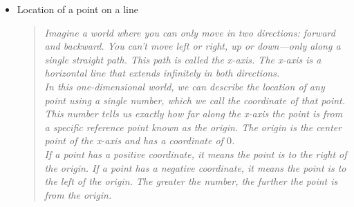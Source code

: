 \begin{itemize}
    \item Location of a point on a line
    \begin{quote}
        \textit{
            Imagine a world where you can only move in two directions: forward and backward. You can't move left or right, up or down—only along a single straight path. This path is called the x-axis. The x-axis is a horizontal line that extends infinitely in both directions. \\[2mm]
            In this one-dimensional world, we can describe the location of any point using a single number, which we call the coordinate of that point. This number tells us exactly how far along the x-axis the point is from a specific reference point known as the origin. The origin is the center point of the x-axis and has a coordinate of $0$.\\[2mm]
            If a point has a positive coordinate, it means the point is to the right of the origin. If a point has a negative coordinate, it means the point is to the left of the origin. The greater the number, the further the point is from the origin.
        }
    \end{quote}

        \begin{center}
        \end{center}


\end{itemize}
